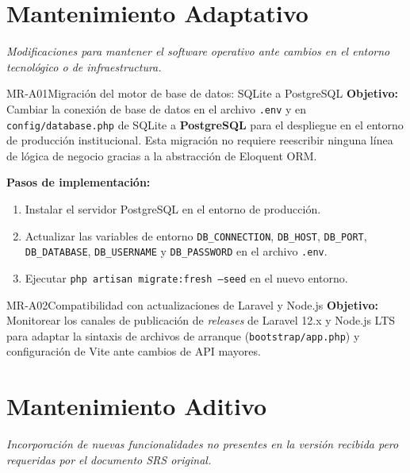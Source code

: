\newpage
\section{Mantenimiento Adaptativo}

\textit{Modificaciones para mantener el software operativo ante cambios en el entorno
tecnológico o de infraestructura.}

\begin{RequisitoFuncional}{MR-A01}{Migración del motor de base de datos: SQLite a PostgreSQL}
    \textbf{Objetivo:} Cambiar la conexión de base de datos en el archivo \texttt{.env}
    y en \texttt{config/database.php} de SQLite a \textbf{PostgreSQL} para el despliegue
    en el entorno de producción institucional. Esta migración no requiere reescribir
    ninguna línea de lógica de negocio gracias a la abstracción de Eloquent ORM.

    \textbf{Pasos de implementación:}
    \begin{enumerate}
        \item Instalar el servidor PostgreSQL en el entorno de producción.
        \item Actualizar las variables de entorno \texttt{DB\_CONNECTION},
              \texttt{DB\_HOST}, \texttt{DB\_PORT}, \texttt{DB\_DATABASE},
              \texttt{DB\_USERNAME} y \texttt{DB\_PASSWORD} en el archivo
              \texttt{.env}.
        \item Ejecutar \texttt{php artisan migrate:fresh --seed} en el nuevo entorno.
    \end{enumerate}
\end{RequisitoFuncional}

\begin{RequisitoFuncional}{MR-A02}{Compatibilidad con actualizaciones de Laravel y Node.js}
    \textbf{Objetivo:} Monitorear los canales de publicación de \textit{releases} de
    Laravel 12.x y Node.js LTS para adaptar la sintaxis de archivos de arranque
    (\texttt{bootstrap/app.php}) y configuración de Vite ante cambios de API mayores.
\end{RequisitoFuncional}

\newpage
\section{Mantenimiento Aditivo}

\textit{Incorporación de nuevas funcionalidades no presentes en la versión recibida
pero requeridas por el documento SRS original.}

